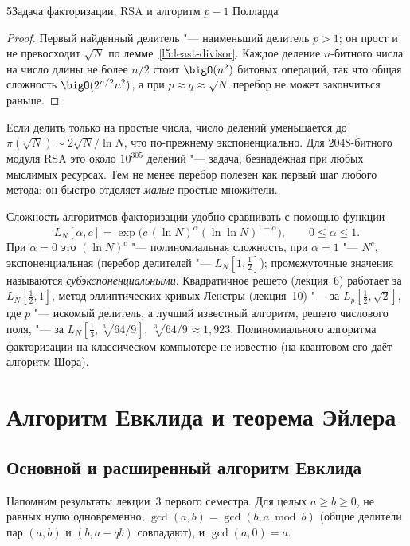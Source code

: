 \begin{lecture}{5}{Задача факторизации, RSA и алгоритм \texorpdfstring{$p - 1$}{p - 1} Полларда}
\begin{proof}
Первый найденный делитель "--- наименьший делитель $p > 1$; он прост и не превосходит
$\sqrt N$ по лемме~\ref{l5:least-divisor}. Каждое деление $n$-битного числа на число длины
не более $n/2$ стоит $\bigO(n^2)$ битовых операций, так что общая сложность
$\bigO(2^{n/2} n^2)$, а при $p \approx q \approx \sqrt N$ перебор не может закончиться раньше.
\end{proof}

Если делить только на простые числа, число делений уменьшается до
$\pi(\sqrt N) \sim 2\sqrt N / \ln N$, что по-прежнему экспоненциально. Для $2048$-битного
модуля RSA это около $10^{305}$ делений "--- задача, безнадёжная при любых мыслимых
ресурсах. Тем не менее перебор полезен как первый шаг любого метода: он быстро отделяет
\emph{малые} простые множители.

Сложность алгоритмов факторизации удобно сравнивать с помощью функции
\[
  L_N[\alpha, c] = \exp\bigl(c\,(\ln N)^{\alpha} (\ln\ln N)^{1 - \alpha}\bigr), \qquad
  0 \le \alpha \le 1.
\]
При $\alpha = 0$ это $(\ln N)^c$ "--- полиномиальная сложность, при $\alpha = 1$ "--- $N^c$,
экспоненциальная (перебор делителей "--- $L_N[1, \frac12]$); промежуточные значения
называются \emph{субэкспоненциальными}. Квадратичное решето (лекция~6) работает за
$L_N[\frac12, 1]$, метод эллиптических кривых Ленстры (лекция~10) "--- за
$L_p[\frac12, \sqrt 2]$, где $p$ "--- искомый делитель, а лучший известный алгоритм, решето
числового поля, "--- за $L_N[\frac13, \sqrt[3]{64/9}]$, $\sqrt[3]{64/9} \approx 1{,}923$.
Полиномиального алгоритма факторизации на классическом компьютере не известно (на квантовом
его даёт алгоритм Шора).


\section{Алгоритм Евклида и теорема Эйлера}

\subsection{Основной и расширенный алгоритм Евклида}

Напомним результаты лекции~3 первого семестра. Для целых $a \ge b \ge 0$, не равных нулю
одновременно, $\gcd(a, b) = \gcd(b, a \bmod b)$ (общие делители пар $(a, b)$ и
$(b, a - qb)$ совпадают), и $\gcd(a, 0) = a$.


\end{lecture}
